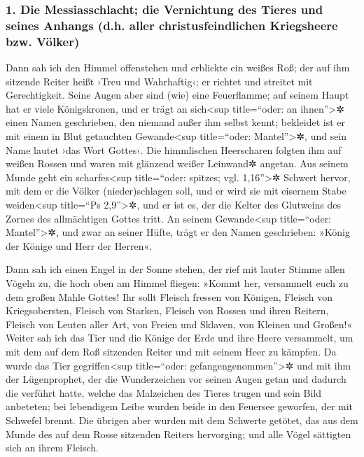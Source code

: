\hypertarget{die-messiasschlacht-die-vernichtung-des-tieres-und-seines-anhangs-d.h.-aller-christusfeindlichen-kriegsheere-bzw.-vuxf6lker}{%
\subsubsection{1. Die Messiasschlacht; die Vernichtung des Tieres und
seines Anhangs (d.h. aller christusfeindlichen Kriegsheere bzw.
Völker)}\label{die-messiasschlacht-die-vernichtung-des-tieres-und-seines-anhangs-d.h.-aller-christusfeindlichen-kriegsheere-bzw.-vuxf6lker}}

 Dann sah ich den Himmel offenstehen und erblickte ein
weißes Roß; der auf ihm sitzende Reiter heißt ›Treu und Wahrhaftig‹; er
richtet und streitet mit Gerechtigkeit.  Seine Augen aber
sind (wie) eine Feuerflamme; auf seinem Haupt hat er viele Königskronen,
und er trägt an sich\textless sup title=``oder: an ihnen''\textgreater✲
einen Namen geschrieben, den niemand außer ihm selbst kennt;
 bekleidet ist er mit einem in Blut getauchten
Gewande\textless sup title=``oder: Mantel''\textgreater✲, und sein Name
lautet ›das Wort Gottes‹.  Die himmlischen Heerscharen
folgten ihm auf weißen Rossen und waren mit glänzend weißer Leinwand✲
angetan.  Aus seinem Munde geht ein scharfes\textless sup
title=``oder: spitzes; vgl. 1,16''\textgreater✲ Schwert hervor, mit dem
er die Völker (nieder)schlagen soll, und er wird sie mit eisernem Stabe
weiden\textless sup title=``Ps 2,9''\textgreater✲, und er ist es, der
die Kelter des Glutweins des Zornes des allmächtigen Gottes tritt.
 An seinem Gewande\textless sup title=``oder:
Mantel''\textgreater✲, und zwar an seiner Hüfte, trägt er den Namen
geschrieben: »König der Könige und Herr der Herren«.

 Dann sah ich einen Engel in der Sonne stehen, der rief
mit lauter Stimme allen Vögeln zu, die hoch oben am Himmel fliegen:
»Kommt her, versammelt euch zu dem großen Mahle Gottes! 
Ihr sollt Fleisch fressen von Königen, Fleisch von Kriegsobersten,
Fleisch von Starken, Fleisch von Rossen und ihren Reitern, Fleisch von
Leuten aller Art, von Freien und Sklaven, von Kleinen und Großen!«
 Weiter sah ich das Tier und die Könige der Erde und ihre
Heere versammelt, um mit dem auf dem Roß sitzenden Reiter und mit seinem
Heer zu kämpfen.  Da wurde das Tier
gegriffen\textless sup title=``oder: gefangengenommen''\textgreater✲ und
mit ihm der Lügenprophet, der die Wunderzeichen vor seinen Augen getan
und dadurch die verführt hatte, welche das Malzeichen des Tieres trugen
und sein Bild anbeteten; bei lebendigem Leibe wurden beide in den
Feuersee geworfen, der mit Schwefel brennt.  Die übrigen
aber wurden mit dem Schwerte getötet, das aus dem Munde des auf dem
Rosse sitzenden Reiters hervorging; und alle Vögel sättigten sich an
ihrem Fleisch.

